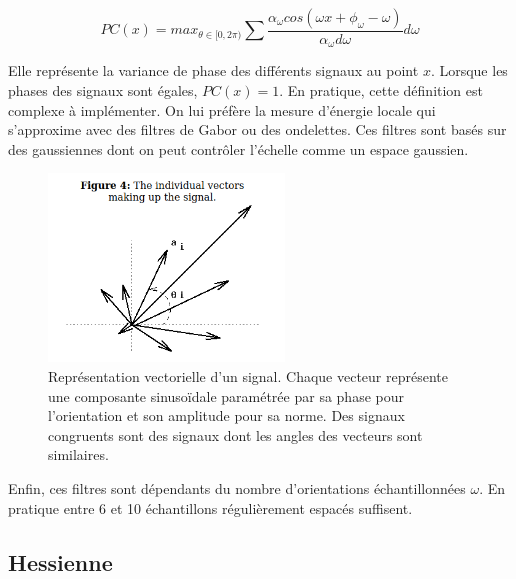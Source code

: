 \begin{equation}
  PC(x) = max_{\theta \in [0,2\pi)} \sum  \frac{ \alpha_{\omega}cos(\omega x + \phi_{\omega} - \omega)  }{ \alpha_{\omega}d \omega } d \omega
\end{equation}

Elle représente la variance de phase des différents signaux au point $x$. Lorsque les phases des signaux sont égales, $PC(x)=1$.
En pratique, cette définition est complexe à implémenter. On lui préfère la mesure d'énergie locale qui s'approxime avec des filtres de Gabor ou des ondelettes. Ces filtres sont basés sur des gaussiennes dont on peut contrôler l'échelle comme un espace gaussien.

\begin{figure}[h]
  \centering
  \includegraphics[height=5cm]{Images/PC_vectors.png}
  \caption{Représentation vectorielle d'un signal. Chaque vecteur représente une composante sinusoïdale paramétrée par sa phase pour l'orientation et son amplitude pour sa norme. Des signaux congruents sont des signaux dont les angles des vecteurs sont similaires.}
  \label{fig:phase_congruency_vectors}
\end{figure}

Enfin, ces filtres sont dépendants du nombre d'orientations échantillonnées $\omega$. En pratique entre 6 et 10 échantillons régulièrement espacés suffisent. 

\subsection{Hessienne}
\label{sec:EA:rehaussement:hessienne}

